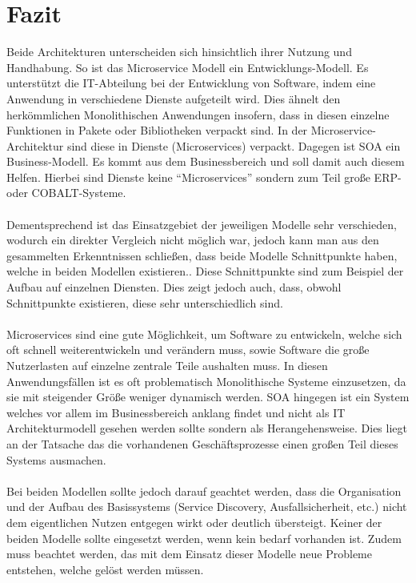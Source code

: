 \section{Fazit}
\label{sec:Fazit}
Beide Architekturen unterscheiden sich hinsichtlich ihrer Nutzung und Handhabung. So ist das Microservice Modell ein Entwicklungs-Modell. Es unterstützt die IT-Abteilung bei der Entwicklung von Software, indem eine Anwendung in verschiedene Dienste aufgeteilt wird. Dies ähnelt den herkömmlichen Monolithischen Anwendungen insofern, dass in diesen einzelne Funktionen in Pakete oder Bibliotheken verpackt sind. In der Microservice-Architektur sind diese in Dienste (Microservices) verpackt. Dagegen ist SOA ein Business-Modell. Es kommt aus dem Businessbereich und soll damit auch diesem Helfen. Hierbei sind Dienste keine "`Microservices"' sondern zum Teil große ERP- oder COBALT-Systeme.
\\\\
Dementsprechend ist das Einsatzgebiet der jeweiligen Modelle sehr verschieden, wodurch ein direkter Vergleich nicht möglich war, jedoch kann man aus den gesammelten Erkenntnissen schließen, dass beide Modelle  Schnittpunkte haben, welche in beiden Modellen existieren.. Diese Schnittpunkte sind zum Beispiel der Aufbau auf einzelnen Diensten. Dies zeigt jedoch auch, dass, obwohl Schnittpunkte existieren, diese sehr unterschiedlich sind.
\\\\
Microservices sind eine gute Möglichkeit, um Software zu entwickeln, welche sich oft schnell weiterentwickeln und verändern muss, sowie Software die große Nutzerlasten auf einzelne zentrale Teile aushalten muss. In diesen Anwendungsfällen ist es oft problematisch Monolithische Systeme einzusetzen, da sie mit steigender Größe weniger dynamisch werden.
SOA hingegen ist ein System welches vor allem im Businessbereich anklang findet und nicht als IT Architekturmodell gesehen werden sollte sondern als Herangehensweise. Dies liegt an der Tatsache das die vorhandenen Geschäftsprozesse einen großen Teil dieses Systems ausmachen.
\\\\
Bei beiden Modellen sollte jedoch darauf geachtet werden, dass die Organisation und der Aufbau des Basissystems (Service Discovery, Ausfallsicherheit, etc.) nicht dem eigentlichen Nutzen entgegen wirkt oder deutlich übersteigt. Keiner der beiden Modelle sollte eingesetzt werden, wenn kein bedarf vorhanden ist. Zudem muss beachtet werden, das mit dem Einsatz dieser Modelle neue Probleme entstehen, welche gelöst werden müssen.
